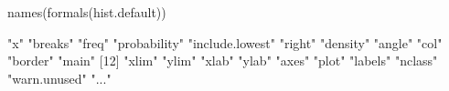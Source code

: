 \begin{Schunk}
\begin{Sinput}
 names(formals(hist.default))
\end{Sinput}
\begin{Soutput}
 [1] "x"              "breaks"         "freq"           "probability"    "include.lowest" "right"          "density"        "angle"          "col"            "border"         "main"          
[12] "xlim"           "ylim"           "xlab"           "ylab"           "axes"           "plot"           "labels"         "nclass"         "warn.unused"    "..."           
\end{Soutput}
\end{Schunk}
